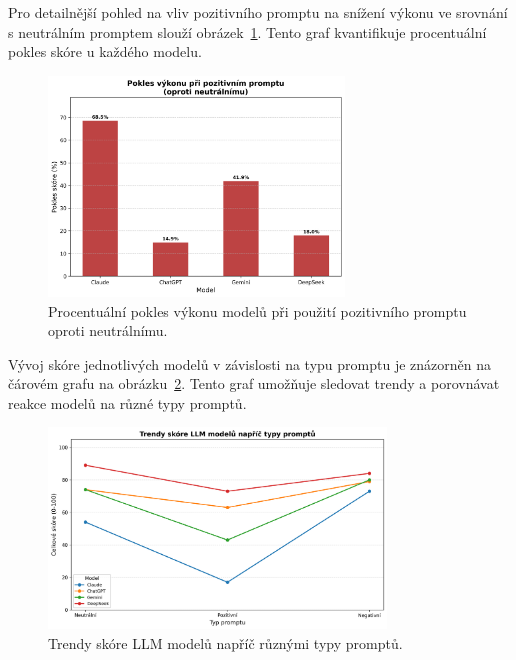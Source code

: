 \documentclass[12pt, a4paper]{article}
\begin{document}
Pro detailnější pohled na vliv pozitivního promptu na snížení výkonu ve srovnání s neutrálním promptem slouží obrázek~\ref{fig:positive_prompt_decrease}. Tento graf kvantifikuje procentuální pokles skóre u každého modelu.

\begin{figure}[H]
\centering
\includegraphics[width=0.7\textwidth]{llm_positive_prompt_decrease.png} %
\caption{Procentuální pokles výkonu modelů při použití pozitivního promptu oproti neutrálnímu.}
\label{fig:positive_prompt_decrease}
\end{figure}

Vývoj skóre jednotlivých modelů v závislosti na typu promptu je znázorněn na čárovém grafu na obrázku~\ref{fig:code_review_trends_line}. Tento graf umožňuje sledovat trendy a porovnávat reakce modelů na různé typy promptů.

\begin{figure}[H]
\centering
\includegraphics[width=0.8\textwidth]{llm_code_review_trends_line.png} %
\caption{Trendy skóre LLM modelů napříč různými typy promptů.}
\label{fig:code_review_trends_line}
\end{figure}
\end{document}
